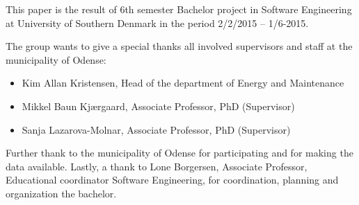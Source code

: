 This paper is the result of 6th semester Bachelor project in Software Engineering at University of Southern Denmark in the period 2/2/2015 – 1/6-2015.

The group wants to give a special thanks all involved supervisors and staff at the municipality of Odense:
\begin{itemize}
  \item Kim Allan Kristensen,     Head of the department of Energy and Maintenance
  \item Mikkel Baun Kjærgaard,     Associate Professor, PhD     (Supervisor)
  \item  Sanja Lazarova-Molnar,     Associate Professor, PhD      (Supervisor)
\end{itemize}
Further thank to the municipality of Odense for participating and for making the data available.
Lastly, a thank to Lone Borgersen, Associate Professor, Educational coordinator Software Engineering, for coordination, planning and organization the bachelor.